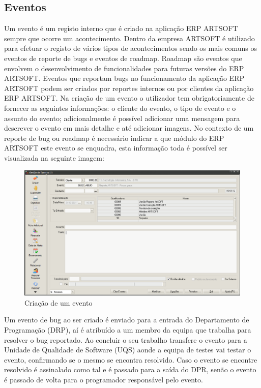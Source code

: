 \documentclass[sigplan]{acmart}
\begin{document}

\subsection{Eventos}

Um evento é um registo interno que é criado na aplicação ERP ARTSOFT sempre que ocorre um acontecimento. Dentro da empresa ARTSOFT é utilizado para efetuar o registo de vários tipos de acontecimentos sendo os mais comuns os eventos de reporte de bugs e eventos de roadmap. Roadmap são eventos que envolvem o desenvolvimento de funcionalidades para futuras versões do ERP ARTSOFT. Eventos que reportam bugs no funcionamento da aplicação ERP ARTSOFT podem ser criados por reportes internos ou por clientes da aplicação ERP ARTSOFT. Na criação de um evento o utilizador tem obrigatoriamente de fornecer as seguintes informações: o cliente do evento, o tipo de evento e o assunto do evento; adicionalmente é possível adicionar uma mensagem para descrever o evento em mais detalhe e até adicionar imagens. No contexto de um reporte de bug ou roadmap é necessário indicar a que módulo do ERP ARTSOFT este evento se enquadra, esta informação toda é possível ser visualizada na seguinte imagem:
\FloatBarrier
\begin{figure}[htbp]
	\centerline{\includegraphics[width=\linewidth]{figures/evento_criacao.png}}
	\caption{Criação de um evento}
	\label{fig1}
\end{figure}
\FloatBarrier
Um evento de bug ao ser criado é enviado para a entrada do Departamento de Programação (DRP), aí é atribuído a um membro da equipa que trabalha para resolver o bug reportado. Ao concluir o seu trabalho transfere o evento para a Unidade de Qualidade de Software (UQS) aonde a equipa de testes vai testar o evento, confirmando se o mesmo se encontra resolvido. Caso o evento se encontre resolvido é assinalado como tal e é passado para a saída do DPR, senão o evento é passado de volta para o programador responsável pelo evento.
\end{document}
